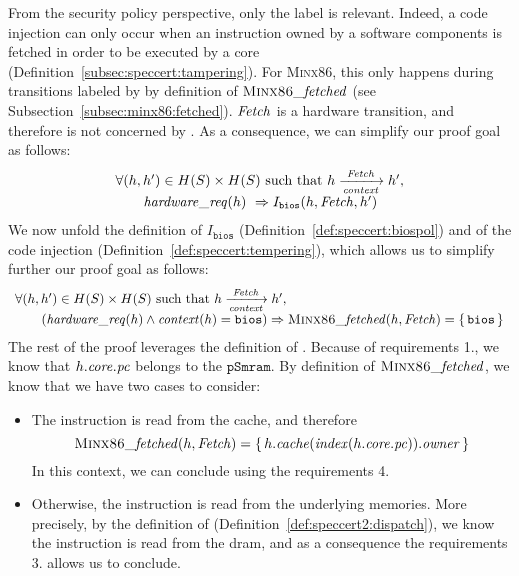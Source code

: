 From the security policy perspective, only the  label is relevant.
%
Indeed, a code injection can only occur when an instruction owned by a software
components is fetched in order to be executed by a core
(Definition~\ref{subsec:speccert:tampering}).
%
For {\scshape Minx86}, this only happens during transitions labeled by
 by definition of \( \textsc{Minx86}\mathit{\_fetched} \) (see
Subsection~\ref{subsec:minx86:fetched}).
%
\( \mathit{Fetch} \) is a hardware transition, and therefore is not concerned by
.
%
As a consequence, we can simplify our proof goal as follows:
%
\[
  \begin{array}{l}
    \forall (h, h') \in H(S) \times H(S) \text{ such that } h
    \xrightarrow[\mathit{context}]{\mathit{Fetch}} h', \\
    \qquad \mathit{hardware\_req}(h)\ \Rightarrow I_{\mathtt{bios}}(h, \mathit{Fetch}, h')
  \end{array}
\]
%
We now unfold the definition of \( I_{\mathtt{bios}} \)
(Definition~\ref{def:speccert:biospol}) and of the code injection
(Definition~\ref{def:speccert:tempering}), which allows us to simplify further
our proof goal as follows:
%
\[
  \begin{array}{l}
    \forall (h, h') \in H(S) \times H(S) \text{ such that } h
    \xrightarrow[\mathit{context}]{\mathit{Fetch}} h', \\
    \qquad (\mathit{hardware\_req}(h) \wedge \mathit{context}(h) = \mathtt{bios})
    \Rightarrow \textsc{Minx86}\mathit{\_fetched}(h, \mathit{Fetch}) =
    \{\,\mathtt{bios}\,\}
  \end{array}
\]
%
The rest of the proof leverages the definition of .
%
Because of requirements 1., we know that \( h.\mathit{core}.\mathit{pc} \) belongs
to the \( \texttt{pSmram} \).
%
By definition of \( \textsc{Minx86}\mathit{\_fetched} \), we know that we have two
cases to consider:
%
\begin{itemize}
\item The instruction is read from the cache, and therefore
  \[
    \textsc{Minx86}\mathit{\_fetched}(h, \mathit{Fetch}) =
    \{\,h.\mathit{cache}(\mathit{index}(h.\mathit{core}.\mathit{pc})).\mathit{owner}\,\}
  \]
  In this context, we can conclude using the requirements 4.
\item Otherwise, the instruction is read from the underlying memories.
  More precisely, by the definition of 
  (Definition~\ref{def:speccert2:dispatch}), we know the instruction is read
  from the \ac{dram}, and as a consequence the requirements 3. allows us to
  conclude.
\end{itemize}

